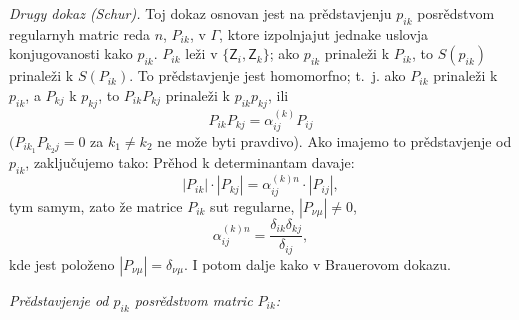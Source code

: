 \documentclass[11pt]{article}
\begin{document}
\emph{Drugy dokaz (Schur).} Toj dokaz osnovan jest na prědstavjenju \(p_{ik}\) posrědstvom regularnyh matric reda \(n\), \(P_{ik}\), v \(\Gamma\), ktore izpolnjajut jednake uslovja konjugovanosti kako \(p_{ik}\). \(P_{ik}\) leži v \(\{\mathsf{Z}_i,\mathsf{Z}_k\}\); ako \(p_{ik}\) prinaleži k \(P_{ik}\), to \(S(p_{ik})\) prinaleži k \(S(P_{ik})\). To prědstavjenje jest homomorfno; t.~j. ako \(P_{ik}\) prinaleži k \(p_{ik}\), a \(P_{kj}\) k \(p_{kj}\), to \(P_{ik}P_{kj}\) prinaleži k \(p_{ik}p_{kj}\), ili
\[
P_{ik}P_{kj}=\alpha_{ij}^{(k)}P_{ij}
\]
\((P_{ik_1}P_{k_2j}=0\) za \(k_1\neq k_2\) ne može byti pravdivo). Ako imajemo to prědstavjenje od \(p_{ik}\), zaključujemo tako: Prěhod k determinantam davaje:
\[
|P_{ik}|\cdot |P_{kj}|=\alpha_{ij}^{(k)n}\cdot |P_{ij}|,
\]
tym samym, zato že matrice \(P_{ik}\) sut regularne, \(|P_{\nu\mu}|\ne0\),
\[
\alpha_{ij}^{(k)n}=\frac{\delta_{ik}\delta_{kj}}{\delta_{ij}},
\]
kde jest položeno \(|P_{\nu\mu}|=\delta_{\nu\mu}\). I potom dalje kako v Brauerovom dokazu.

\emph{Prědstavjenje od \(p_{ik}\) posrědstvom matric \(P_{ik}\):}
\end{document}
